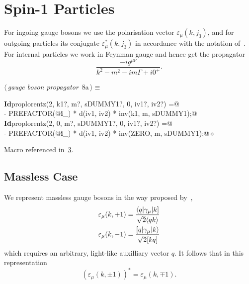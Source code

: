 \documentclass[a4paper,12pt]{amsart}
\newcommand{\Spaa}[1]{\langle #1 \rangle}
\newcommand{\Spab}[1]{\langle #1]}
\newcommand{\Spba}[1]{[ #1 \rangle}
\newcommand{\Spbb}[1]{[ #1 ]}
\renewcommand{\NWtarget}[2]{\hypertarget{#1}{#2}}
\renewcommand{\NWlink}[2]{\hyperlink{#1}{#2}}
\renewcommand{\NWtxtMacroRefIn}{Macro referenced in}
\renewcommand{\NWsep}{${\diamond}$}
\begin{document}
\section{Spin-1 Particles}
For ingoing gauge bosons we use the polarisation vector
$\varepsilon_\mu(k, j_3)$, and for outgoing particles its
conjugate $\varepsilon_\mu^\ast(k, j_3)$ in accordance with the
notation of~\cite{1}. For internal particles we work in Feynman gauge
and hence get the propagator
\begin{equation}
\frac{-ig^{\mu\nu}}{k^2-m^2-im\Gamma+i0^+}\text{.}
\end{equation}
\begin{flushleft} \small
\begin{minipage}{\linewidth}\label{scrap18}\raggedright\small
\NWtarget{nuweb8a}{} $\langle\,${\itshape gauge boson propagator}\nobreak\ {\footnotesize {8a}}$\,\rangle\equiv$
\vspace{-1ex}
\begin{list}{}{} \item
\mbox{}\verb@@\hbox{\sffamily\bfseries Id}\verb@ proplorentz(2, k1?, m?, sDUMMY1?, 0, iv1?, iv2?) =@\\
\mbox{}\verb@   - PREFACTOR(@\hbox{\sffamily\bfseries i}\verb@_) * d(iv1, iv2) * inv(k1, m, sDUMMY1);@\\
\mbox{}\verb@@\hbox{\sffamily\bfseries Id}\verb@ proplorentz(2, 0, m?, sDUMMY1?, 0, iv1?, iv2?) =@\\
\mbox{}\verb@   - PREFACTOR(@\hbox{\sffamily\bfseries i}\verb@_) * d(iv1, iv2) * inv(ZERO, m, sDUMMY1);@{\NWsep}
\end{list}
\vspace{-1.5ex}
\footnotesize
\begin{list}{}{\setlength{\itemsep}{-\parsep}\setlength{\itemindent}{-\leftmargin}}
\item \NWtxtMacroRefIn\ \NWlink{nuweb3}{3}.

\item{}
\end{list}
\end{minipage}\vspace{4ex}
\end{flushleft}
\subsection{Massless Case}
We represent massless gauge bosons in the way proposed by~\cite{Xu},
\begin{align}
\varepsilon_\mu(k, +1) &= \frac{\Spab{q\vert\gamma_\mu\vert k}}{%
   \sqrt{2}\Spaa{qk}}\\
\varepsilon_\mu(k, -1) &= \frac{\Spba{q\vert\gamma_\mu\vert k}}{%
   \sqrt{2}\Spbb{kq}}
\end{align}
which requires an arbitrary, light-like auxilliary vector $q$. It
follows that in this representation
\begin{equation}\label{eq:polarisation-conjugate}
\left(\varepsilon_\mu(k,\pm1)\right)^\ast = \varepsilon_\mu(k,\mp1)\text{.}
\end{equation}
\end{document}
